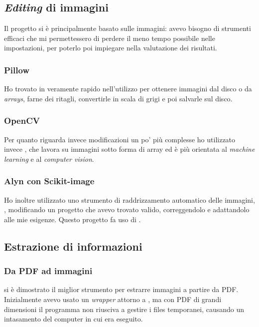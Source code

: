     \subsection{\textit{Editing} di immagini}
    Il progetto si è principalmente basato sulle immagini: avevo bisogno di strumenti efficaci che mi permettessero di perdere il meno tempo possibile nelle impostazioni, per poterlo poi impiegare nella valutazione dei risultati.
        \subsubsection*{Pillow}
        Ho trovato in \cite{prod:pillow} veramente rapido nell'utilizzo per ottenere immagini dal disco o da \textit{arrays}, farne dei ritagli, convertirle in scala di grigi e poi salvarle sul disco. 
        \subsubsection*{OpenCV}
        Per quanto riguarda invece modificazioni un po' più complesse ho utilizzato invece \cite{prod:cv2}, che lavora su immagini sotto forma di array ed è più orientata al \textit{machine learning} e al \textit{computer vision}. 
        \subsubsection*{Alyn con Scikit-image}
        Ho inoltre utilizzato uno strumento di raddrizzamento automatico delle immagini, \cite{prod:alyn}, modificando un progetto che avevo trovato valido, correggendolo e adattandolo alle mie esigenze. Questo progetto fa uso di \cite{prod:scikit-image}.

    \subsection{Estrazione di informazioni}
        \subsubsection*{Da PDF ad immagini}
        \cite{prod:pdftoppm} si è dimostrato il miglior strumento per estrarre immagini a partire da PDF. Inizialmente avevo usato un \textit{wrapper} attorno a \cite{prod:imagemagik}, ma con PDF di grandi dimensioni il programma non riusciva a gestire i files temporanei, causando un intasamento del computer in cui era eseguito.
